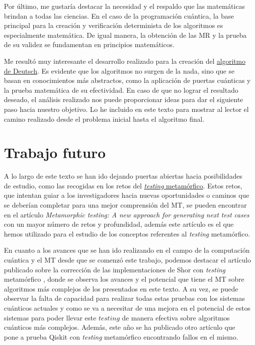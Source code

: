 Por último, me gustaría destacar la necesidad y el respaldo que las matemáticas brindan a todas las ciencias. En el caso de la programación cuántica, la base principal para la creación y verificación determinista de los algoritmos es especialmente matemática. De igual manera, la obtención de las MR y la prueba de su validez se fundamentan en principios matemáticos.\newline

Me resultó muy interesante el desarrollo realizado para la creación del \hyperref[Sec3.2:Deutsch]{algoritmo de Deutsch}.  Es evidente que los algoritmos no surgen de la nada, sino que se basan en conocimientos más abstractos, como la aplicación de puertas cuánticas y la prueba matemática de su efectividad. En caso de que no lograr el resultado deseado, el análisis realizado nos puede proporcionar ideas para dar el siguiente paso hacia nuestro objetivo. Lo he incluido en este texto para mostrar al lector el camino realizado desde el problema inicial hasta el algoritmo final.

\section{Trabajo futuro}
\label{Sec5.2:Futuro}

A lo largo de este texto se han ido dejando puertas abiertas hacia posibilidades de estudio, como las recogidas en los retos del \hyperref[Sec2.4:Metamorfico]{\textit{testing} metamórfico}. Estos retos, que intentan guiar a los investigadores hacia nuevas oportunidades o caminos que se deberían completar para una mejor comprensión del MT, se pueden encontrar en el artículo \textit{Metamorphic testing: A new approach for generating next test cases} \cite{AR:MTmain:2008} con un mayor número de retos y profundidad, además este artículo es el que hemos utilizado para el estudio de los conceptos referentes al \textit{testing} metamórfico.\newline

En cuanto a los avances que se han ido realizando en el campo de la computación cuántica y el MT desde que se comenzó este trabajo, podemos destacar el artículo publicado sobre la corrección de las implementaciones de Shor con \textit{testing} metamórfico \cite{metamorphicShor:2022}, donde se observa los avances y el potencial que tiene el MT sobre algoritmos más complejos de los presentados en este texto. A su vez, se puede observar la falta de capacidad para realizar todas estas pruebas con los sistemas cuánticos actuales y como se va a necesitar de una mejora en el potencial de estos sistemas para poder llevar este $testing$ de manera efectiva sobre algoritmos cuánticos más complejos. Además, este año se ha publicado otro artículo que pone a prueba Qiskit con \textit{testing} metamórfico \cite{AR:QiskitMT:2023} encontrando fallos en el mismo.\newline


